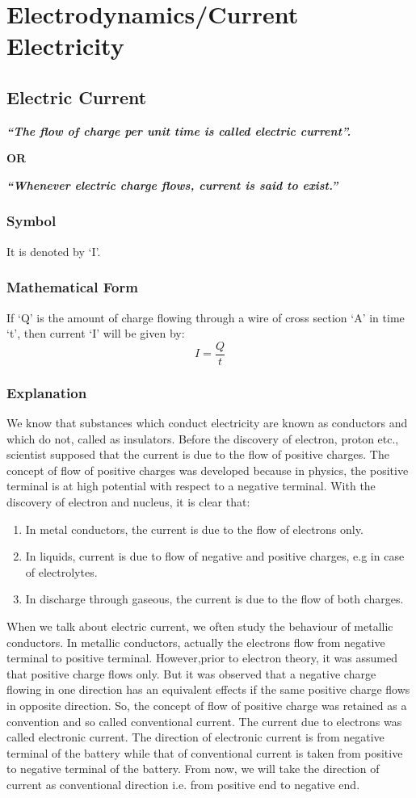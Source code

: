 \chapter{Electrodynamics/Current Electricity}
\section{Electric Current}
\textit{\textbf{“The flow of charge per unit time is called electric current”.}}
\begin{center}
    \textbf{OR}
\end{center}
\textit{\textbf{“Whenever electric charge flows, current is said to exist.”}}
\subsection*{Symbol}
It is denoted by `I'.
\subsection*{Mathematical Form}
If `Q' is the amount of charge flowing through a wire of cross section ‘A’ in time ‘t’, then current ‘I’ will be given by:
\begin{equation}\label{eq:12.1}
    I = \frac{Q}{t} 
\end{equation}
\subsection*{Explanation}
We know that substances which conduct electricity are known as conductors and which do not, called as insulators. Before the discovery of electron, proton etc., scientist supposed that the current is due to the flow of positive charges. The concept of flow of positive charges was developed because in physics, the positive terminal is at high potential with respect to a negative terminal. With the discovery of electron and nucleus, it is clear that:
\begin{enumerate}[label = (\roman*)]
    \item In metal conductors, the current is due to the flow of electrons only.
    \item In liquids, current is due to flow of negative and positive charges, e.g in case of electrolytes.
    \item In discharge through gaseous, the current is due to the flow of both charges.
\end{enumerate}
When we talk about electric current, we often study the behaviour of metallic conductors. In metallic conductors, actually the electrons flow from negative terminal to positive terminal. However,prior to electron theory, it was assumed that positive charge flows only. But it was observed that a negative charge flowing in one direction has an equivalent effects if the same positive charge flows in opposite direction. So, the concept of flow of positive charge was retained as a convention and so called conventional current. The current due to electrons was called electronic current. The direction of electronic current is from negative terminal of the battery while that of conventional current is taken from positive to negative terminal of the battery.
From now, we will take the direction of current as conventional direction 
i.e. from positive end to negative end.
